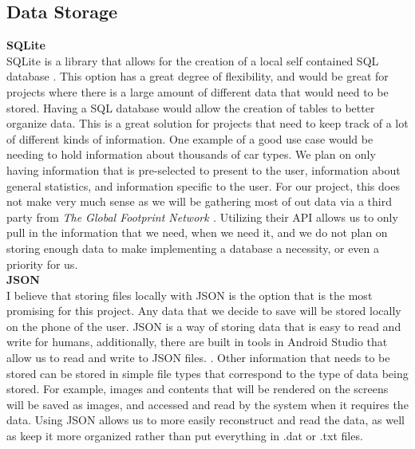 \documentclass[onecolumn, draftclsnofoot,10pt, compsoc]{IEEEtran}
\begin{document}
\subsection{Data Storage}

\textbf{SQLite} \\
SQLite is a library that allows for the creation of a local self contained SQL database \cite{sqlite}. 
This option has a great degree of flexibility, and would be great for projects where there is a large amount of different data that would need to be stored.
Having a SQL database would allow the creation of tables to better organize data.
This is a great solution for projects that need to keep track of a lot of different kinds of information.
One example of a good use case would be needing to hold information about thousands of car types.
We plan on only having information that is pre-selected to present to the user, information about general statistics, and information specific to the user.
For our project, this does not make very much sense as we will be gathering most of out data via a third party from {\em The Global Footprint Network \cite{footprintnetwork}.}
Utilizing their API allows us to only pull in the information that we need, when we need it, and we do not plan on storing enough data to make
implementing a database a necessity, or even a priority for us.\\


\noindent \textbf{JSON} \\
I believe that storing files locally with JSON is the option that is the most promising for this project. 
Any data that we decide to save will be stored locally on the phone of the user. 
JSON is a way of storing data that is easy to read and write for humans, additionally, there are built in tools in Android Studio that allow us to read and write to JSON files. \cite{JSON} \cite{androidstudiojson}.
Other information that needs to be stored can be stored in simple file types that correspond to the type of data being stored.
For example, images and contents that will be rendered on the screens will be saved as images, and accessed and read by the system when it requires the data.
Using JSON allows us to more easily reconstruct and read the data, as well as keep it more organized rather than put everything in .dat or .txt files.\\
\end{document}
